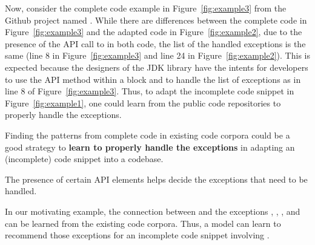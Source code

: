 





Now, consider the complete code example in Figure~\ref{fig:example3}
from the Github project named . While there are
differences between the complete code in Figure~\ref{fig:example3} and
the adapted code in Figure~\ref{fig:example2}, due to the presence of
the API call to  in both code, the list of
the handled exceptions is the same (line 8 in
Figure~\ref{fig:example3} and line 24 in
Figure~\ref{fig:example2}). This is expected because the designers of
the JDK library have the intents for developers to use the API method
 within a  block and to
handle the list of exceptions as in line 8 of
Figure~\ref{fig:example3}. Thus, to adapt the incomplete code snippet
in Figure~\ref{fig:example1}, one could learn from the public code
repositories to properly handle the exceptions.

\begin{Observation} 
Finding the patterns from complete code in existing code corpora could
be a good strategy to {\bf learn to properly handle the exceptions} in
adapting an (incomplete) code snippet into a codebase.
\end{Observation}


\begin{Observation} 
The presence of certain API elements helps decide the exceptions that
need to be handled.
\end{Observation}

In our motivating example, the connection between
 and the exceptions
, ,
, and
 can be learned from the existing
code corpora. Thus, a model can learn to recommend those exceptions
for an incomplete code snippet involving .

